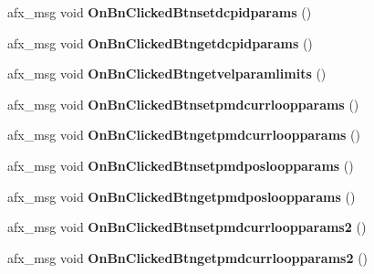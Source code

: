 \begin{DoxyCompactItemize}
\item 
afx\+\_\+msg void {\bfseries On\+Bn\+Clicked\+Btnsetdcpidparams} ()\hypertarget{class_c_a_p_t_d_l_l_client_dlg_a62a0b3073634bca0691ce47ba6771e7b}{}\label{class_c_a_p_t_d_l_l_client_dlg_a62a0b3073634bca0691ce47ba6771e7b}

\item 
afx\+\_\+msg void {\bfseries On\+Bn\+Clicked\+Btngetdcpidparams} ()\hypertarget{class_c_a_p_t_d_l_l_client_dlg_ae5d0a2f0463685f546074ea5639a2904}{}\label{class_c_a_p_t_d_l_l_client_dlg_ae5d0a2f0463685f546074ea5639a2904}

\item 
afx\+\_\+msg void {\bfseries On\+Bn\+Clicked\+Btngetvelparamlimits} ()\hypertarget{class_c_a_p_t_d_l_l_client_dlg_a595397719265580a11754983ee72d00b}{}\label{class_c_a_p_t_d_l_l_client_dlg_a595397719265580a11754983ee72d00b}

\item 
afx\+\_\+msg void {\bfseries On\+Bn\+Clicked\+Btnsetpmdcurrloopparams} ()\hypertarget{class_c_a_p_t_d_l_l_client_dlg_ad5692fbffa8ef6303166b235f13a52f9}{}\label{class_c_a_p_t_d_l_l_client_dlg_ad5692fbffa8ef6303166b235f13a52f9}

\item 
afx\+\_\+msg void {\bfseries On\+Bn\+Clicked\+Btngetpmdcurrloopparams} ()\hypertarget{class_c_a_p_t_d_l_l_client_dlg_a20ab02276996f1c14eb330a8b94d51f9}{}\label{class_c_a_p_t_d_l_l_client_dlg_a20ab02276996f1c14eb330a8b94d51f9}

\item 
afx\+\_\+msg void {\bfseries On\+Bn\+Clicked\+Btnsetpmdposloopparams} ()\hypertarget{class_c_a_p_t_d_l_l_client_dlg_ad192b299156b1d62dbe94417a6ee3900}{}\label{class_c_a_p_t_d_l_l_client_dlg_ad192b299156b1d62dbe94417a6ee3900}

\item 
afx\+\_\+msg void {\bfseries On\+Bn\+Clicked\+Btngetpmdposloopparams} ()\hypertarget{class_c_a_p_t_d_l_l_client_dlg_a9a86951839aa6d027db3d3436018d17f}{}\label{class_c_a_p_t_d_l_l_client_dlg_a9a86951839aa6d027db3d3436018d17f}

\item 
afx\+\_\+msg void {\bfseries On\+Bn\+Clicked\+Btnsetpmdcurrloopparams2} ()\hypertarget{class_c_a_p_t_d_l_l_client_dlg_ab960684b140ee3ba37cd1c3c1d2e4763}{}\label{class_c_a_p_t_d_l_l_client_dlg_ab960684b140ee3ba37cd1c3c1d2e4763}

\item 
afx\+\_\+msg void {\bfseries On\+Bn\+Clicked\+Btngetpmdcurrloopparams2} ()\hypertarget{class_c_a_p_t_d_l_l_client_dlg_ae3367fb716cbc98c8428b6a89d919f6a}{}\label{class_c_a_p_t_d_l_l_client_dlg_ae3367fb716cbc98c8428b6a89d919f6a}


\end{DoxyCompactItemize}
